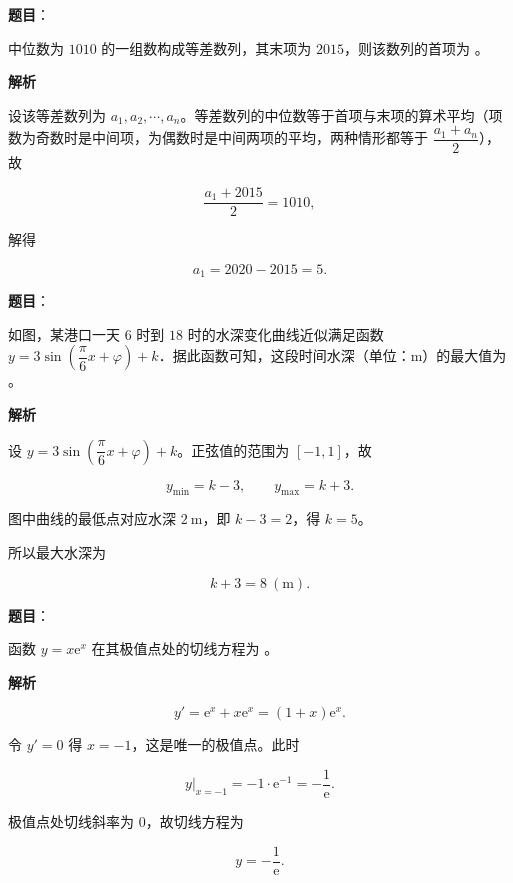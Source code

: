 \begin{answer}

\textbf{题目}：

中位数为 $1010$ 的一组数构成等差数列，其末项为 $2015$，则该数列的首项为 \gkblank{}。

\textbf{解析}

设该等差数列为 $a_{1},a_{2},\cdots,a_{n}$。等差数列的中位数等于首项与末项的算术平均（项数为奇数时是中间项，为偶数时是中间两项的平均，两种情形都等于 $\dfrac{a_{1}+a_{n}}{2}$），故

\nopagebreak[4]
\[
\frac{a_{1}+2015}{2}=1010,
\]

解得

\nopagebreak[4]
\[
a_{1}=2020-2015=5.
\]


\end{answer}
\begin{answer}

\textbf{题目}：

如图，某港口一天 $6$ 时到 $18$ 时的水深变化曲线近似满足函数 $y=3\sin\left(\dfrac{\pi}{6}x+\varphi\right)+k$．据此函数可知，这段时间水深（单位：$\mathrm{m}$）的最大值为 \gkblank{}。
\nopagebreak[4]
\begin{center}\end{center}
\nopagebreak[4]
\textbf{解析}

设 $y=3\sin\left(\dfrac{\pi}{6}x+\varphi\right)+k$。正弦值的范围为 $[-1,1]$，故

\nopagebreak[4]
\[
y_{\min}=k-3,\qquad y_{\max}=k+3.
\]

图中曲线的最低点对应水深 $2\ \mathrm{m}$，即 $k-3=2$，得 $k=5$。

所以最大水深为

\nopagebreak[4]
\[
k+3=8\ (\mathrm{m}).
\]


\end{answer}
\begin{answer}

\textbf{题目}：

函数 $y=x\mathrm{e}^{x}$ 在其极值点处的切线方程为 \gkblank{}。

\textbf{解析}

\nopagebreak[4]
\[
y'=\mathrm{e}^{x}+x\mathrm{e}^{x}=(1+x)\mathrm{e}^{x}.
\]

令 $y'=0$ 得 $x=-1$，这是唯一的极值点。此时

\nopagebreak[4]
\[
y\Big|_{x=-1}=-1\cdot \mathrm{e}^{-1}=-\frac{1}{\mathrm{e}}.
\]

极值点处切线斜率为 $0$，故切线方程为

\nopagebreak[4]
\[
y=-\frac{1}{\mathrm{e}}.
\]


\end{answer}
